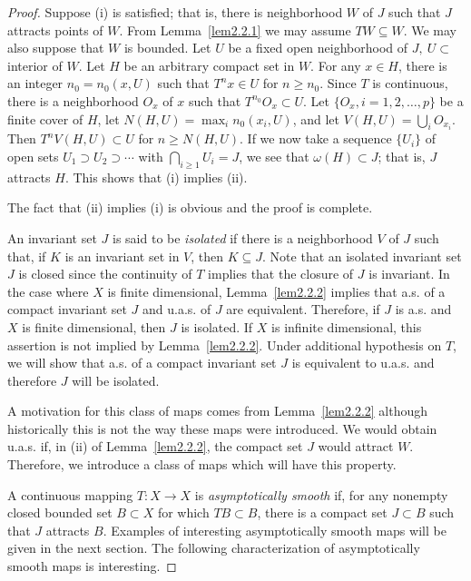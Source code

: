 \documentclass{surv-l}
\theoremstyle{plain}
\theoremstyle{definition}
\numberwithin{equation}{section}
\numberwithin{figure}{chapter}
\begin{document}
\begin{proof}
Suppose (i) is satisfied; that is, there is neighborhood $W$ of $J$ such that $J$ attracts points of $W$. From Lemma~\ref{lem2.2.1} we may assume $TW\subseteq W$. We may also suppose that $W$ is bounded. Let $U$ be a fixed open neighborhood of $J,\ U\subset$ interior of $W$. Let $H$ be an arbitrary compact set in $W$. For any $x \in H$, there is an integer $n_{0}=n_{0}(x, U)$ such that $T^{n}x\in U$ for $n\geq n_{0}$. Since $T$ is continuous, there is a neighborhood $O_{x}$ of $x$ such that $T^{n_{0}}O_{x}\subset U$. Let $\{O_{x}, i=1, 2, \ldots,p\}$ be a finite cover of $H$, let $N(H, U)=\max_{i}n_{0}(x_{i}, U)$, and let $V(H, U)=\bigcup_{i}O_{x_{i}}$. Then $T^{n}V(H, U)\subset U$ for $n\geq N(H, U)$. If we now take a sequence $\{U_{i}\}$ of open sets $ U_{1}\supset U_{2}\supset\cdots$ with $ \bigcap_{i\geq 1}U_{i}=J$, we see that $\omega(H)\subset J$; that is, $J$ attracts $H$. This shows that (i) implies (ii).

The fact that (ii) implies (i) is obvious and the proof is complete.

An invariant set $J$ is said to be \emph{isolated} if there is a neighborhood $V$ of $J$ such that, if $K$ is an invariant set in $V$, then $K\subseteq J$. Note that an isolated invariant set $J$ is closed since the continuity of $T$ implies that the closure of $J$ is invariant. In the case where $X$ is finite dimensional, Lemma~\ref{lem2.2.2} implies that a.s. of a compact invariant set $J$ and u.a.s. of $J$ are equivalent. Therefore, if $J$ is a.s. and $X$ is finite dimensional, then $J$ is isolated. If $X$ is infinite dimensional, this assertion is not implied by Lemma~\ref{lem2.2.2}. Under additional hypothesis on $T$, we will show that a.s. of a compact invariant set $J$ is equivalent to u.a.s. and therefore $J$ will be isolated.

A motivation for this class of maps comes from Lemma~\ref{lem2.2.2} although historically this is not the way these maps were introduced. We would obtain u.a.s. if, in (ii) of Lemma~\ref{lem2.2.2}, the compact set $J$ would attract $W$. Therefore, we introduce a class of maps which will have this property.

A continuous mapping $T\!:X\rightarrow X$ is \emph{asymptotically smooth} if, for any nonempty closed bounded set $B\subset X$ for which $TB\subset B$, there is a compact set $J\subset B$ such that $J$ attracts $B$. Examples of interesting asymptotically smooth maps will be given in the next section. The following characterization of asymptotically smooth maps is interesting.
\end{proof}
\end{document}
